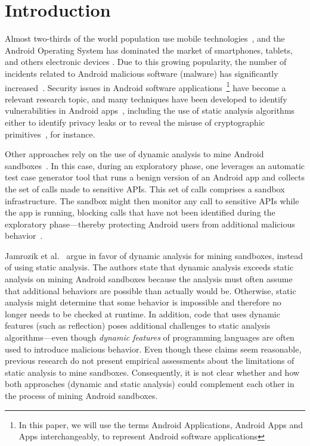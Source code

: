 \section{Introduction}\label{sec:introduction}

Almost two-thirds of the world population use mobile technologies~\cite{Comscore}, and the Android Operating System has dominated the market of smartphones, tablets, and others electronic devices \cite{statcounter}. Due to this growing popularity, the number of incidents related to Android malicious software (malware) has significantly increased~\cite{DBLP:journals/comsur/FarukiBLGGCR15,DBLP:journals/csur/SufatrioTCT15}. Security issues in Android software applications~\footnote{In this paper, we will use the terms Android Applications, Android Apps and Apps interchangeably, to represent Android software applications} have become a relevant research topic, and many techniques have been developed to identify vulnerabilities in Android apps~\cite{DBLP:conf/pldi/ArztRFBBKTOM14}, including the use of static analysis algorithms either to identify privacy leaks or to reveal the misuse of cryptographic primitives~\cite{krueger:ecoop-2018,rahaman:ccs-2019}, for instance.

Other approaches rely on the use of dynamic analysis to mine Android sandboxes~\cite{DBLP:conf/icse/JamrozikSZ16}. In this case, during an exploratory phase, one leverages an automatic test case generator tool that runs a benign version of an Android app and collects the set of calls made to sensitive APIs. This set of calls comprises a sandbox infrastructure. The sandbox might then monitor any call to sensitive APIs while the app is running, blocking calls that have not been identified during the exploratory phase---thereby protecting Android users from additional malicious behavior~\cite{DBLP:conf/icse/JamrozikSZ16}.

Jamrozik et al.~\cite{DBLP:conf/icse/JamrozikSZ16} argue in favor of dynamic analysis for mining sandboxes, instead of using static analysis.
The authors state that dynamic analysis exceeds static analysis on mining Android sandboxes because the analysis must often
assume that additional behaviors are possible than actually would be.
Otherwise, static analysis might determine that some behavior is impossible and therefore no longer needs to be checked at runtime. In addition,
code that uses dynamic features (such as reflection) poses additional challenges to static analysis algorithms---even though \emph{dynamic features}
of programming languages are often used to introduce malicious behavior. Even though these claims
seem reasonable, previous research do not present empirical assessments about the limitations of static analysis to mine sandboxes.
Consequently, it is not clear whether and how both approaches (dynamic and static analysis) could complement each other in the process of mining Android sandboxes.

